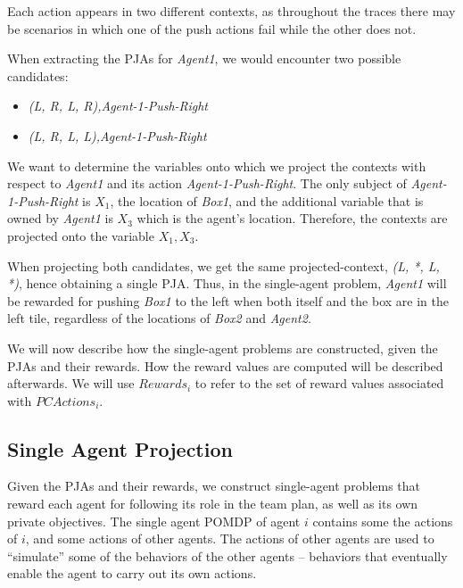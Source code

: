 \documentclass[letterpaper]{article} %
\begin{document}
Each action appears in two different contexts, as throughout the traces there may be scenarios in which one of the push actions fail while the other does not.

When extracting the PJAs for \emph{Agent1}, we would encounter two possible candidates:
\begin{itemize}
    \item \emph{(L, R, L, R),Agent-1-Push-Right}
    \item \emph{(L, R, L, L),Agent-1-Push-Right}
\end{itemize}

We want to determine the variables onto which we project the contexts with respect to \emph{Agent1} and its action \emph{Agent-1-Push-Right}. The only subject of \emph{Agent-1-Push-Right} is $X_1$, the location of \emph{Box1}, and the additional variable that is owned by \emph{Agent1} is $X_3$ which is the agent's location. Therefore, the contexts are projected onto the variable $X_1, X_3$. 

When projecting both candidates, we get the same projected-context, \emph{(L, *, L, *)}, hence obtaining a single PJA.
Thus, in the single-agent problem, \emph{Agent1} will be rewarded for pushing \emph{Box1} to the left when both itself and the box are in the left tile, regardless of the locations of \emph{Box2} and \emph{Agent2}.

We will now describe how the single-agent problems are constructed, given the PJAs and their rewards.
How the reward values are computed will be described afterwards. We will use $Rewards_i$ to refer to the set
of reward values associated with $PCActions_i$.


\subsection{Single Agent Projection}

Given the PJAs and their rewards, we construct single-agent problems that reward each agent for following its role in the team plan, as well as its own private objectives. The single agent POMDP of agent $i$ contains some the actions of $i$, and some actions of other agents. The actions of other agents are used to ``simulate'' some of the behaviors of the other agents -- behaviors that eventually enable the agent to carry out its own actions.
\end{document}
